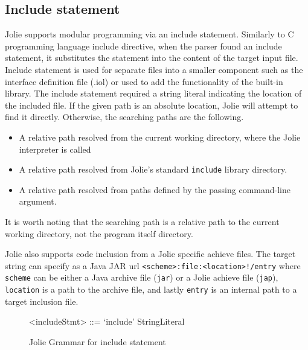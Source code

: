 \subsection{Include statement}
\label{sec:jolie-include}

Jolie supports modular programming via an include statement. Similarly to C programming language include directive, when the parser found an include statement, it substitutes the statement into the content of the target input file. Include statement is used for separate files into a smaller component such as the interface definition file (.iol) or used to add the functionality of the built-in library. The include statement required a string literal indicating the location of the included file. If the given path is an absolute location, Jolie will attempt to find it directly. Otherwise, the searching paths are the following.

\begin{itemize}
    \item A relative path resolved from the current working directory, where the Jolie interpreter is called
    \item A relative path resolved from Jolie's standard \texttt{include} library directory.
    \item A relative path resolved from paths defined by the passing command-line argument.
\end{itemize}

It is worth noting that the searching path is a relative path to the current working directory, not the program itself directory.

Jolie also supports code inclusion from a Jolie specific achieve files.
The target string can specify as a Java JAR url \texttt{<scheme>:file:<location>\newline!/{entry}} where \texttt{scheme} can be either a Java archive file (\texttt{jar}) or a Jolie achieve file (\texttt{jap}), \texttt{location} is a path to the archive file, and lastly \texttt{entry} is an internal path to a target inclusion file.

\begin{figure}[h]
    \begin{framed}
        \begin{grammar}
            <includeStmt> ::= `include' StringLiteral
        \end{grammar}
    \end{framed}
    \caption{Jolie Grammar for include statement}
    \label{fig:jolie-definition}
\end{figure}

